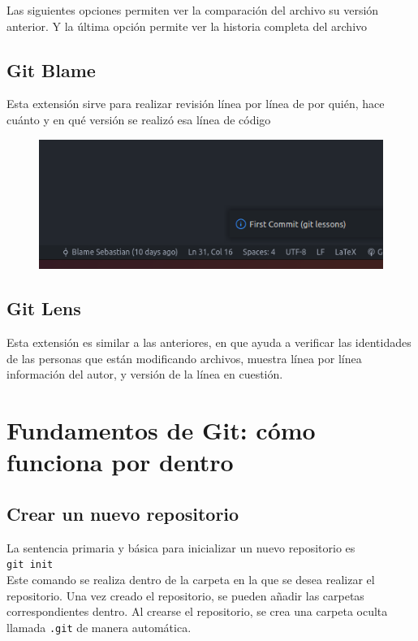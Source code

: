 Las siguientes opciones permiten ver la comparación del archivo su versión anterior. Y la última opción permite ver la historia completa del archivo

\subsection{Git Blame}

Esta extensión sirve para realizar revisión línea por línea de por quién, hace cuánto y en qué versión se realizó esa línea de código


\begin{figure}[H]
    \centering
    \includegraphics[width=0.6\columnwidth]{Github/Git_f3.png}
\end{figure}


\subsection{Git Lens}

Esta extensión es similar a las anteriores, en que ayuda a verificar las identidades de las personas que están modificando archivos, muestra línea por línea información del autor, y versión de la línea en cuestión.  

\section{Fundamentos de Git: cómo funciona por dentro}

\subsection{Crear un nuevo repositorio}

La sentencia primaria y básica para inicializar un nuevo repositorio es \\

\texttt{git init} \\

Este comando se realiza dentro de la carpeta en la que se desea realizar el repositorio. Una vez creado el repositorio, se pueden añadir las carpetas correspondientes dentro. Al crearse el repositorio, se crea una carpeta oculta llamada \texttt{.git} de manera automática.

